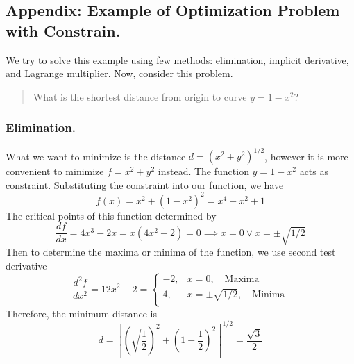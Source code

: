 \documentclass[../../../main.tex]{subfiles}
\begin{document}
\subsection{Appendix: Example of Optimization Problem with Constrain.}
We try to solve this example using few methods: elimination, implicit derivative, and Lagrange multiplier. Now, consider this problem.
\begin{quotation}
    What is the shortest distance from origin to curve $y=1-x^2$?
\end{quotation}

\subsubsection{Elimination.} What we want to minimize is the distance $d=({x^2+y^2})^{1/2}$, however it is more convenient to minimize $f=x^2+y^2$ instead. The function $y=1-x^2$ acts as constraint. Substituting the constraint into our function, we have
\begin{equation*}
    f(x)=x^2+(1-x^2)^2=x^4-x^2+1
\end{equation*}
The critical points of this function determined by
\begin{equation*}
    \frac{df}{dx}=4x^3-2x=x(4x^2-2)=0\implies x=0\lor x=\pm\sqrt{1/2}
\end{equation*}
Then to determine the maxima or minima of the function, we use second test derivative
\begin{equation*}
    \frac{d^2f}{dx^2}=12x^2-2=\begin{cases}
        -2, & x=0, \quad\text{Maxima}              \\
        4,  & x=\pm \sqrt{1/2},\quad \text{Minima} \\
    \end{cases}
\end{equation*}
Therefore, the minimum distance is
\begin{equation*}
    d=\left[\left(\sqrt{\frac{1}{2}}\right)^2+\left(1-\frac{1}{2}\right)^2\right]^{1/2}=\frac{\sqrt{3}}{2}
\end{equation*}
\end{document}
